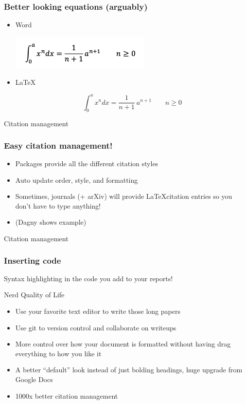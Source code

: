 \documentclass{beamer}
\begin{document}
\begin{frame}[fragile]
  \frametitle{Better looking equations (arguably)}

  \begin{itemize}

  \item{Word}

  \includegraphics[scale=.75]{word-equation.png}

  \item{\LaTeX}

  \begin{equation}
  \int_0^a x^n dx = \frac{1}{n+1}\
  a^{n+1} \qquad n \geq 0
  \end{equation}

  \end{itemize}

\end{frame}

\begin{frame}{Citation management}
  \frametitle{Easy citation management!}
  \begin{itemize}
    \item<1-> {Packages provide all the different citation styles}
    \item<2-> {Auto update order, style, and formatting}
    \item<3-> {Sometimes, journals (+ arXiv) will provide \LaTeX citation entries so you don't have to type anything!}
    \item<4-> {(Dagny shows example)}
  \end{itemize}
\end{frame}

\begin{frame}{Citation management}
  \frametitle{Inserting code}
  Syntax highlighting in the code you add to your reports!
\end{frame}

\begin{frame}{Nerd Quality of Life}
  \begin{itemize}
    \item<1-> {Use your favorite text editor to write those long papers}
    \item<2-> {Use git to version control and collaborate on writeups}
    \item<3-> {More control over how your document is formatted without having drag everything to how you like it}
    \item<4-> {A better ``default'' look instead of just bolding headings, huge upgrade from Google Docs}
    \item<5-> {1000x better citation management}
  \end{itemize}
\end{frame}
\end{document}
